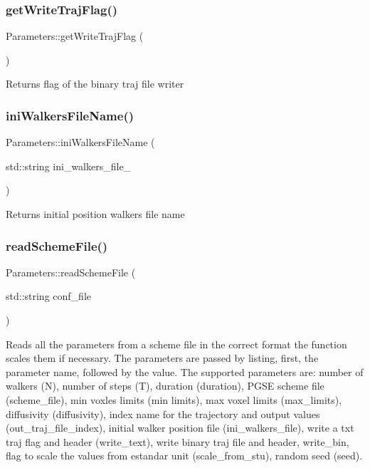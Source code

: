 \subsubsection{\texorpdfstring{get\+Write\+Traj\+Flag()}{getWriteTrajFlag()}}
{\footnotesize\ttfamily Parameters\+::get\+Write\+Traj\+Flag (\begin{DoxyParamCaption}{ }\end{DoxyParamCaption})}

\begin{DoxyReturn}{Returns}
flag of the binary traj file writer 
\end{DoxyReturn}
\mbox{\label{class_parameters_a73d64bb093a93c2b806883f5504d8fb5}} 
\subsubsection{\texorpdfstring{ini\+Walkers\+File\+Name()}{iniWalkersFileName()}}
{\footnotesize\ttfamily Parameters\+::ini\+Walkers\+File\+Name (\begin{DoxyParamCaption}\item[{std\+::string}]{ini\+\_\+walkers\+\_\+file\+\_\+ }\end{DoxyParamCaption})}

\begin{DoxyReturn}{Returns}
initial position walkers file name 
\end{DoxyReturn}
\mbox{\label{class_parameters_afa8dd9d59fa727c3c2b2fe366efb2c14}} 
\subsubsection{\texorpdfstring{read\+Scheme\+File()}{readSchemeFile()}}
{\footnotesize\ttfamily Parameters\+::read\+Scheme\+File (\begin{DoxyParamCaption}\item[{std\+::string}]{conf\+\_\+file }\end{DoxyParamCaption})}



Reads all the parameters from a scheme file in the correct format the function scales them if necessary. The parameters are passed by listing, first, the parameter name, followed by the value. The supported parameters are\+: number of walkers (N), number of steps (T), duration (duration), P\+G\+SE scheme file (scheme\+\_\+file), min voxles limits (min limits), max voxel limits (max\+\_\+limits), diffusivity (diffusivity), index name for the trajectory and output values (out\+\_\+traj\+\_\+file\+\_\+index), initial walker position file (ini\+\_\+walkers\+\_\+file), write a txt traj flag and header (write\+\_\+text), write binary traj file and header, write\+\_\+bin, flag to scale the values from estandar unit (scale\+\_\+from\+\_\+stu), random seed (seed). 


